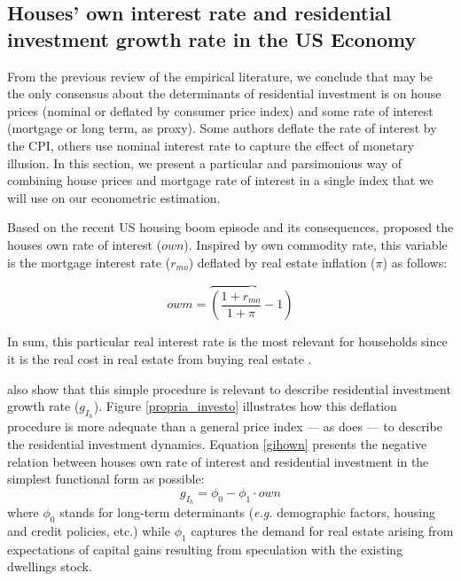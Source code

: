 \documentclass[12pt, a4paper]{article}
\begin{document}
\subsection{Houses' own interest rate and residential investment growth rate in the US Economy}
\label{sec:org47b6c8e}
\label{sc:own}

From the previous review of the empirical literature, we conclude that may be the only consensus about the determinants of residential investment is on house prices (nominal or deflated by consumer price index) and some rate of interest (mortgage or long term, as proxy).
Some authors deflate the rate of interest by the CPI, others use nominal interest rate to capture the effect of monetary illusion.
In this section, we present a particular and parsimonious way of combining house prices and mortgage rate of interest in a single index that we will use on our econometric estimation.

Based on the recent US housing boom episode and its consequences, \textcite{teixeira_crescimento_2015}  proposed the houses own rate of interest (\(own\)).
Inspired by \citeauthor*{sraffaDrHayekMoney1932} \citeyear*{sraffaDrHayekMoney1932} own commodity rate, this variable is the mortgage interest rate (\(r_{mo}\)) deflated by real estate inflation (\(\pi\)) as follows:
\begin{latex}
\begin{equation}
owm =  \overbrace{\left(\frac{1+r_{mo}}{1+\pi} - 1\right)}
\end{equation}
\end{latex}
In sum, this particular real interest rate is the most relevant for households since it is the real cost in real estate from buying real estate  \cite[p.~53]{teixeira_crescimento_2015}.

\textcite{teixeira_crescimento_2015} also show that this simple procedure is relevant to describe residential investment growth rate (\(g_{I_{h}}\)).
Figure \ref{propria_investo} illustrates how this deflation procedure is more adequate than a general price index --- as
\textcite[p.~143--6]{fair_macroeconometric_2013} does --- to describe the residential investment dynamics.
Equation \ref{gihown} presents the negative relation between houses own rate of interest and residential investment in the simplest functional form as possible:
\begin{equation}
\label{gihown}
g_{I_h} = \phi_0 - \phi_1\cdot own
\end{equation}
where \(\phi_0\) stands for long-term determinants (\emph{e.g.} demographic factors, housing and credit policies, etc.) while \(\phi_1\) captures the demand for real estate arising from expectations of capital gains resulting from speculation with the existing dwellings stock.
\end{document}

